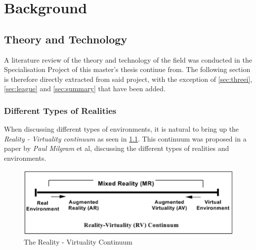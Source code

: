 \chapter{Background}
\label{chap:background}


\section{Theory and Technology}
    A literature review of the theory and technology of the field was conducted in the Specialisation Project of this master's thesis continue from. The following section is therefore directly extracted from said project\cite{specialisation}, with the exception of \cref{sec:threei}, \cref{sec:league} and \cref{sec:summary} that have been added.
    
    \subsection{Different Types of Realities}
        When discussing different types of environments, it is natural to bring up the \emph{Reality - Virtuality continuum} \cite{reality_virtuality_continuum} as seen in \cref{fig:reality_virtuality_continuum}. This continuum was proposed in a paper by \emph{Paul Milgram} et al, discussing the different types of realities and environments.
        
        \begin{figure}[!ht]
            \centering
            \includegraphics[width=\linewidth]{figures/reality_virtuality_continuum.png}
            \caption{The Reality - Virtuality Continuum}
            \label{fig:reality_virtuality_continuum}
        \end{figure}
        
